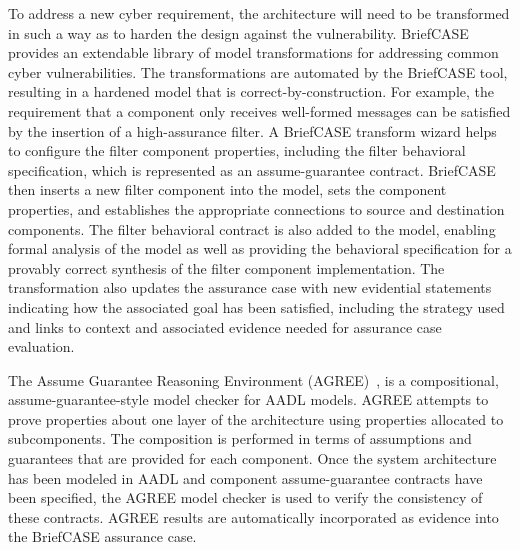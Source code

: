 To address a new cyber requirement, the architecture will need to be transformed in such a way as to harden the design against the vulnerability. BriefCASE provides an extendable library of model transformations for addressing common cyber vulnerabilities. 
The transformations are automated by the BriefCASE tool, resulting in a hardened model that is correct-by-construction. 
For example, the requirement that a component only receives well-formed messages can be satisfied by the insertion of a high-assurance filter. A BriefCASE transform wizard helps to configure the filter component properties, including the filter behavioral specification, which is represented as an assume-guarantee contract. BriefCASE then inserts a new filter component into the model, sets the component properties, and establishes the appropriate connections to source and destination components. The filter behavioral contract is also added to the model, enabling formal analysis of the model as well as providing the behavioral specification for a provably correct synthesis of the filter component implementation. 
The transformation also updates the assurance case with new evidential statements indicating how the associated goal has been satisfied, including the strategy used and links to context and associated evidence needed for assurance case evaluation.

The Assume Guarantee Reasoning Environment (AGREE)~\cite{compositional-analysis-agree}, is a compositional, assume-guarantee-style model checker for AADL models. AGREE attempts to prove properties about one layer of the architecture using properties allocated to subcomponents. The composition is performed in terms of assumptions and guarantees that are provided for each component.  
Once the system architecture has been modeled in AADL and component assume-guarantee contracts have been specified, the AGREE model checker is used to verify the consistency of these contracts.
%
%
% 
AGREE results are automatically incorporated as evidence into the BriefCASE assurance case.

